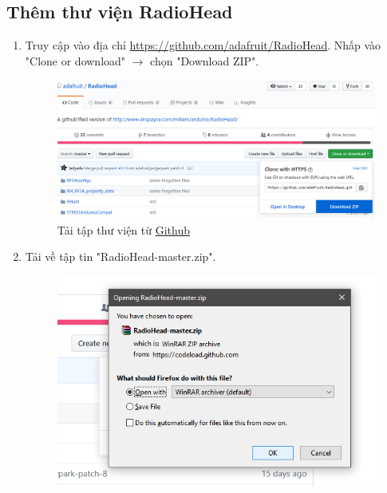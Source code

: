 \subsection{Thêm thư viện RadioHead}
\begin{enumerate}
\item Truy cập vào địa chỉ \href{https://github.com/adafruit/RadioHead}{https://github.com/adafruit/RadioHead}. Nhấp vào "Clone or download" $\rightarrow$ chọn "Download ZIP".
\begin{center}
\begin{figure}[htp]
\begin{center}
\includegraphics[scale=0.5]{image4/arduino8.png}
\end{center}
\caption{Tải tập thư viện từ \href{https://github.com/adafruit/RadioHead}{Github}}
\end{figure}
\end{center}
\item Tải về tập tin "RadioHead-master.zip".
\begin{center}
\begin{figure}[htp]
\begin{center}
\includegraphics[scale=0.8]{image4/arduino9.png}

\end{center}
\end{figure}
\end{center}
\end{enumerate}
